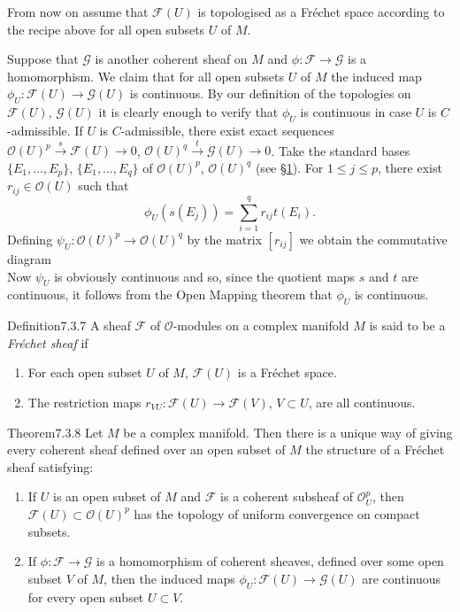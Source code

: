 From now on assume that $\mathcal F(U)$ is topologised as a Fr\'echet space according to the recipe above for all open subsets $U$ of $M$.

Suppose that $\mathcal G$ is another coherent sheaf on $M$ and $\phi:\mathcal F\to\mathcal G$ is a homomorphism. We claim that for all open subsets $U$ of $M$ the induced map $\phi_U:\mathcal F(U)\to\mathcal G(U)$ is continuous. By our definition of the topologies on $\mathcal F(U)$, $\mathcal G(U)$ it is clearly enough to verify that $\phi_U$ is continuous in case $U$ is $C$-admissible. If $U$ is $C$-admissible, there exist exact sequences $\mathcal O(U)^p\xrightarrow{s}\mathcal F(U)\to0$, $\mathcal O(U)^q\xrightarrow{t}\mathcal G(U)\to0$. Take the standard bases $\{E_1,\ldots,E_p\}$, $\{E_1,\ldots,E_q\}$ of $\mathcal O(U)^p$, $\mathcal O(U)^q$ (see \hyperref[sec:7:1]{\S1}). For $1\leq j\leq p$, there exist $r_{ij}\in\mathcal O(U)$ such that
\[
\phi_U(s(E_j))=\sum_{i=1}^q r_{ij}t(E_i).
\]
Defining $\psi_U:\mathcal O(U)^p\to\mathcal O(U)^q$ by the matrix $[r_{ij}]$ we obtain the commutative diagram
\[

\]
Now $\psi_U$ is obviously continuous and so, since the quotient maps $s$ and $t$ are continuous, it follows from the Open Mapping theorem that $\phi_U$ is continuous.
\begin{originaltheorem}{Definition}{7.3.7}
A sheaf $\mathcal F$ of $\mathcal O$-modules on a complex manifold $M$ is said to be a \emph{Fr\'echet sheaf} if
\begin{enumerate}[label=\alph*)]
\item For each open subset $U$ of $M$, $\mathcal F(U)$ is a Fr\'echet space.
\item The restriction maps $r_{VU}:\mathcal F(U)\to\mathcal F(V)$, $V\subset U$, are all continuous.
\end{enumerate}
\end{originaltheorem}
\begin{originaltheorem}{Theorem}{7.3.8}
Let $M$ be a complex manifold. Then there is a unique way of giving every coherent sheaf defined over an open subset of $M$ the structure of a Fr\'echet sheaf satisfying:
\begin{enumerate}[label=\alph*)]
\item If $U$ is an open subset of $M$ and $\mathcal F$ is a coherent subsheaf of $\mathcal O_U^p$, then $\mathcal F(U)\subset\mathcal O(U)^p$ has the topology of uniform convergence on compact subsets.
\item If $\phi:\mathcal F\to\mathcal G$ is a homomorphism of coherent sheaves, defined over some open subset $V$ of $M$, then the induced maps $\phi_U:\mathcal F(U)\to\mathcal G(U)$ are continuous for every open subset $U\subset V$.
\end{enumerate}
\end{originaltheorem}
